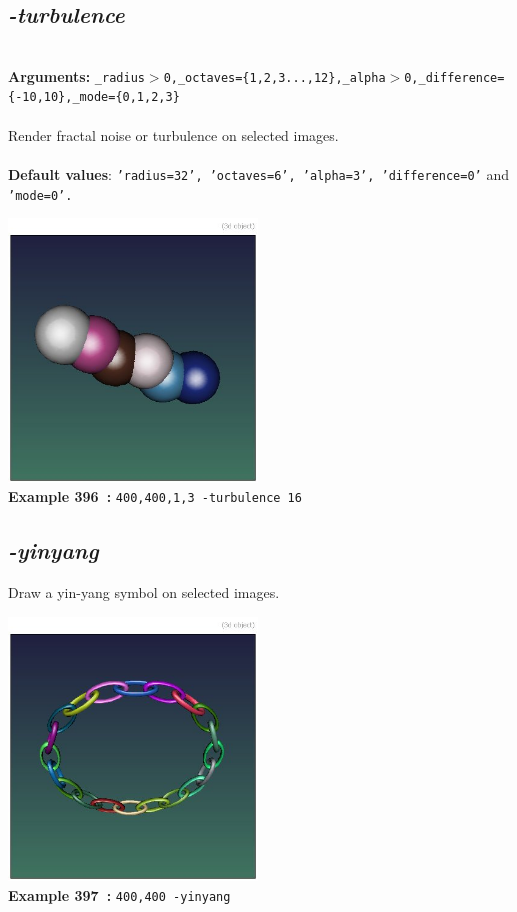 \documentclass[a4paper,11pt,twoside]{book}
\begin{document}
\subsection{\emph{-turbulence} }\vspace*{-0.5em}
~\\\textbf{Arguments: } 
{\small \texttt{\_radius$>$0,\_octaves=\{1,2,3...,12\},\_alpha$>$0,\_difference=\{-10,10\},\_mode=\{0,1,2,3\}}}\\~\\
Render fractal noise or turbulence on selected images.
~\\~\\\textbf{Default values}: {\small \texttt{'radius=32', 'octaves=6', 'alpha=3', 'difference=0'} and \texttt{'mode=0'.}}
\begin{center}\includegraphics[keepaspectratio=true,height=7cm,width=\textwidth]{img/gmic_def396.jpg}\\
{\footnotesize \textbf{Example 396~:} \texttt{400,400,1,3 -turbulence 16}}
\end{center}

\subsection{\emph{-yinyang} }\vspace*{-0.5em}
Draw a yin-yang symbol on selected images.
\begin{center}\includegraphics[keepaspectratio=true,height=7cm,width=\textwidth]{img/gmic_def397.jpg}\\
{\footnotesize \textbf{Example 397~:} \texttt{400,400 -yinyang}}
\end{center}
\end{document}
